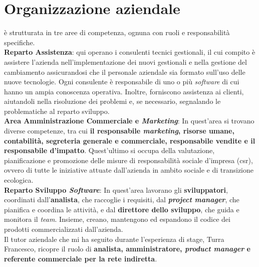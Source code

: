 \section{Organizzazione aziendale}
{\company} è strutturata in tre aree di competenza, ognuna con ruoli e responsabilità specifiche.\\
\textbf{Reparto Assistenza}: qui operano i consulenti tecnici gestionali, il cui compito è assistere l'azienda nell'implementazione dei nuovi gestionali 
e nella gestione del cambiamento assicurandosi che il personale aziendale sia formato sull'uso delle nuove tecnologie. Ogni consulente è responsabile di uno 
o più \textit{software} di cui hanno un ampia conoscenza operativa. Inoltre, forniscono assistenza ai clienti, aiutandoli 
nella risoluzione dei problemi e, se necessario, segnalando le problematiche al reparto sviluppo.\\
\textbf{Area Amministrazione Commerciale e \textit{Marketing}}: In quest'area si trovano diverse competenze, tra cui \textbf{il responsabile \textit{marketing}, risorse umane, contabilità, 
segreteria generale e commerciale, responsabile vendite e il responsabile d'impatto}. Quest'ultimo si occupa della valutazione, pianificazione e promozione delle misure 
di responsabilità sociale d'impresa (\gls{csr}), ovvero di tutte le iniziative attuate dall'azienda in ambito sociale e di transizione ecologica.\\
\textbf{Reparto Sviluppo \textit{Software}}: In quest'area lavorano gli \textbf{sviluppatori}, coordinati dall'\textbf{analista}, che raccoglie i requisiti, dal 
\textbf{\textit{project manager}}, che pianifica e coordina le attività, e dal \textbf{direttore dello sviluppo}, che guida e monitora il \textit{team}. Insieme, creano, mantengono 
ed espandono il codice dei prodotti commercializzati dall'azienda.\\
Il tutor aziendale che mi ha seguito durante l'esperienza di stage, Turra Francesco, ricopre il ruolo di \textbf{analista, amministratore, \textit{product manager}
 e referente commerciale per la rete indiretta}.
